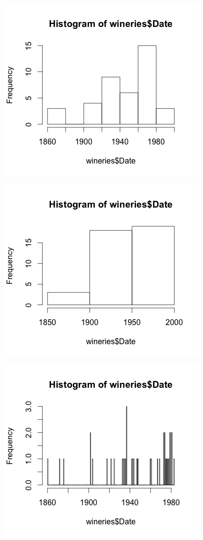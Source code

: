 \documentclass[12pt]{article}
\begin{document}
\begin{enumerate}[label=(\alph*)]
\begin{figure}[h!]
\centering
\includegraphics[scale=.8]{5.png}
\end{figure}
\begin{figure}[h!]
\centering
\includegraphics[scale=.8]{2.png}
\end{figure}
\clearpage
\begin{figure}[h!]
\centering
\includegraphics[scale=.8]{200.png}
\end{figure}


\end{enumerate}
\end{document}
